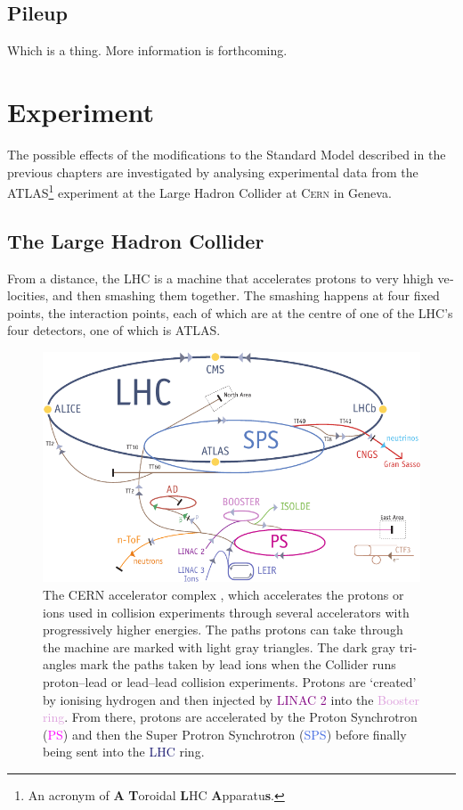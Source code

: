\begin{english}
\section{Pileup}

Which is a thing. More information is forthcoming.

\chapter{Experiment}\label{ch.exp}

The possible effects of the modifications to the Standard Model described in the previous chapters are investigated by analysing experimental data from the ATLAS\footnote{An acronym of \textbf{A} \textbf{T}oroidal \textbf{L}HC \textbf{A}pparatu\textbf{s}.} experiment at the Large Hadron Collider at \textsc{Cern} in Geneva.

\section{The Large Hadron Collider}
From a distance, the LHC is a machine that accelerates protons to very hhigh velocities, and then smashing them together. The smashing happens at four fixed points, the interaction points, each of which are at the centre of one of the LHC's four detectors, one of which is ATLAS.

\begin{figure}[hbtp]
\begin{center}
\includegraphics[width=.8\textwidth]{Cernrings}
\end{center}
\begin{minipage}[b]{\textwidth}
\caption{The CERN accelerator complex \cite{cernbro}, which accelerates the protons or ions used in collision experiments through several accelerators with progressively higher energies. The paths protons can take through the machine are marked with light gray triangles. The dark gray triangles mark the paths taken by lead ions when the Collider runs proton--lead or lead--lead collision experiments. Protons are `created' by ionising hydrogen and then injected by \textcolor{Purple}{LINAC 2} into the \textcolor{Plum}{Booster ring}. From there, protons are accelerated by the Proton Synchrotron (\textcolor{Magenta}{PS}) and then the Super Protron Synchrotron (\textcolor{RoyalBlue}{SPS}) before finally being sent into the \textcolor{MidnightBlue}{LHC} ring.}
\label{cernrings}
\end{minipage}
\end{figure}


\end{english}
